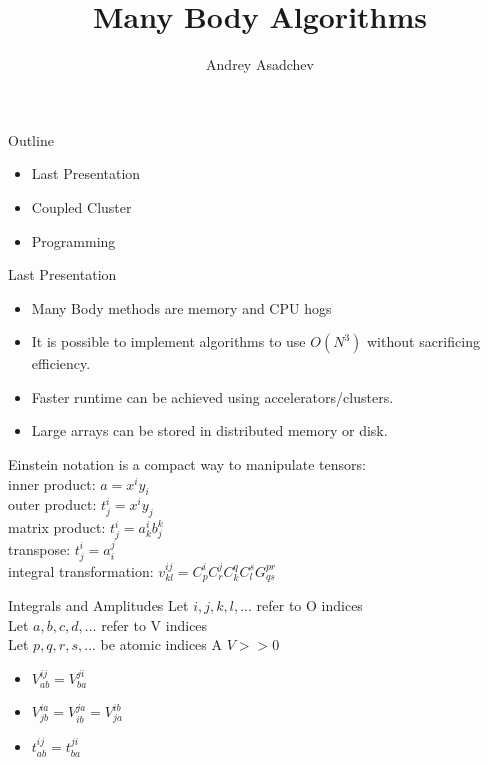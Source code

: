\documentclass{beamer}
\title[Many Body Algorithms]{Many Body Algorithms}
\author{ Andrey Asadchev}
\institute{Iowa State University}
\begin{document}
\begin{frame}
  \titlepage
\end{frame}


\begin{frame}{Outline}
  \begin{itemize}
  \item Last Presentation
  \item Coupled Cluster
  \item Programming
  \end{itemize}
\end{frame}

\begin{frame}{Last Presentation}
  \begin{itemize}
  \item Many Body methods are memory and CPU hogs
  \item It is possible to implement algorithms to use $O(N^3)$
    without sacrificing efficiency.
  \item Faster runtime can be achieved using accelerators/clusters.
  \item Large arrays can be stored in distributed memory or disk.
  \end{itemize}
  Einstein notation is a compact way to manipulate tensors:\\
  inner product: $a = x^i y_i$ \\
  outer product: $t^i_j = x^i y_j$ \\
  matrix product: $t^i_j = a^i_k b^k_j$ \\
  transpose: $t^i_j = a^j_i$ \\
  integral transformation: $v^{ij}_{kl} = C^i_p C^j_r C^q_k C^s_l G^{pr}_{qs}$ \\
\end{frame}


\begin{frame}{Integrals and Amplitudes}
  Let $i,j,k,l,...$ refer to O indices\\
  Let $a,b,c,d,...$ refer to V indices\\
  Let $ p,q,r,s,...$ be atomic indices A
  $V >> 0$
  \begin{itemize}
  \item $V^{ij}_{ab} = V^{ji}_{ba}$
  \item $V^{ia}_{jb} = V^{ja}_{ib} = V^{ib}_{ja}$
  \item $t^{ij}_{ab} = t^{ji}_{ba}$
\end{itemize}
\end{frame}
\end{document}
